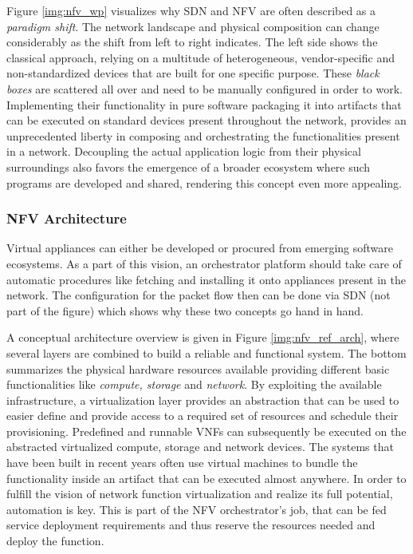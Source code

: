 Figure \ref{img:nfv_wp} visualizes why SDN and NFV are often described as a \textit{paradigm shift}. The network landscape and physical composition can change considerably as the shift from left to right indicates. The left side shows the classical approach, relying on a multitude of heterogeneous, vendor-specific and non-standardized devices that are built for one specific purpose. These \textit{black boxes} are scattered all over and need to be manually configured in order to work. Implementing their functionality in pure software packaging it into artifacts that can be executed on standard devices present throughout the network, provides an unprecedented liberty in composing and orchestrating the functionalities present in a network. Decoupling the actual application logic from their physical surroundings also favors the emergence of a broader ecosystem where such programs are developed and shared, rendering this concept even more appealing.

\subsubsection{NFV Architecture}
Virtual appliances can either be developed or procured from emerging software ecosystems. As a part of this vision, an orchestrator platform should take care of automatic procedures like fetching and installing it onto appliances present in the network. The configuration for the packet flow then can be done via SDN (not part of the figure) which shows why these two concepts go hand in hand. 

A conceptual architecture overview is given in Figure \ref{img:nfv_ref_arch}, where several layers are combined to build a reliable and functional system. The bottom summarizes the physical hardware resources available providing different basic functionalities like \textit{compute, storage} and \textit{network}.  By exploiting the available infrastructure, a virtualization layer provides an abstraction that can be used to easier define and provide access to a required set of resources and schedule their provisioning. Predefined and runnable VNFs can subsequently be executed on the abstracted virtualized compute, storage and network devices. The systems that have been built in recent years often use virtual machines to bundle the functionality inside an artifact that can be executed almost anywhere. In order to fulfill the vision of network function virtualization and realize its full potential, automation is key. This is part of the NFV orchestrator's job, that can be fed service deployment requirements and thus reserve the resources needed and deploy the function.

